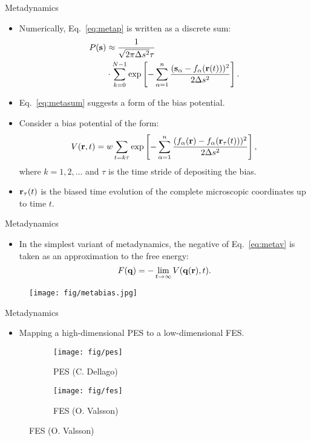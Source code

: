 \documentclass[10pt]{beamer}
\begin{document}
\begin{frame}{Metadynamics}
\begin{itemize}
\setlength\itemsep{1em}
  \item Numerically, Eq.~\ref{eq:metap} is written as a discrete sum:
  \begin{align}
    P({\bf s}) &\approx \frac{1}{\sqrt{2\pi\Delta s^2}\tau} \nonumber\\
           &\cdot \sum_{k=0}^{N-1} \exp\left[ -\sum_{\alpha=1}^n \frac{({\bf s}_\alpha - f_\alpha({\bf r}(t)))^2}{2\Delta s^2} \right].
    \label{eq:metasum}
  \end{align}
  \item Eq.~\ref{eq:metasum} suggests a form of the bias potential.
  \item Consider a bias potential of the form:
  \begin{equation}
    V({\bf r},t) = w \sum_{t=k\tau} \exp\left[ -\sum_{\alpha=1}^n \frac{(f_\alpha({\bf r}) - f_\alpha({\bf r}_\tau(t)))^2}{2\Delta s^2} \right],
    \label{eq:metav}
  \end{equation}
  where $k=1,2,\dots$ and $\tau$ is the time stride of depositing the bias.
  \item ${\bf r}_\tau(t)$ is the biased time evolution of the complete microscopic coordinates up to time $t$.
\end{itemize}
\end{frame}

\begin{frame}{Metadynamics}
\begin{itemize}
\setlength\itemsep{1em}
  \item In the simplest variant of metadynamics, the negative of Eq.~\ref{eq:metav} is taken as an approximation to the free energy:
  \begin{equation}
    F(\mathbf{q}) = -\lim_{t\rightarrow\infty} V(\mathbf{q}({\bf r}), t).
  \end{equation}
\end{itemize}
\begin{figure}
  \texttt{[image: fig/metabias.jpg]}
\end{figure}
\end{frame}

\begin{frame}{Metadynamics}
\begin{itemize}
\setlength\itemsep{1em}
  \item Mapping a high-dimensional PES to a low-dimensional FES.
\end{itemize}
\begin{figure}
\centering
\begin{subfigure}{.5\textwidth}
  \centering
  \texttt{[image: fig/pes]}
  \caption{PES (C. Dellago)}
\end{subfigure}%
\begin{subfigure}{.5\textwidth}
  \centering
  \texttt{[image: fig/fes]}
  \caption{FES (O. Valsson)}
\end{subfigure}
\end{figure}
\end{frame}
\end{document}
